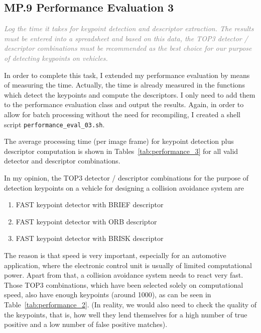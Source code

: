 \documentclass[a4paper]{scrartcl}
\begin{document}
\subsection*{MP.9 Performance Evaluation 3}
\textcolor{gray}{\textit{Log the time it takes for keypoint detection and descriptor extraction. The results must be entered into a spreadsheet and based on this data, the TOP3 detector / descriptor combinations must be recommended as the best choice for our purpose of detecting keypoints on vehicles.}}

In order to complete this task, I extended my performance evaluation by means of measuring the time.
Actually, the time is already measured in the functions which detect the keypoints and compute
the descriptors. I only need to add them to the performance evaluation class and output the results.
Again, in order to allow for batch processing without the need for recompiling,
I created a shell script \texttt{performance\_eval\_03.sh}.

The average processing time (per image frame) for keypoint detection plus descriptor computation
is shown in Tables~\ref{tab:performance_3}
for all valid detector and descriptor combinations.

In my opinion, the TOP3 detector / descriptor combinations for the purpose
of detection keypoints on a vehicle for designing a collision avoidance system
are
\begin{enumerate}
	\item FAST keypoint detector with BRIEF descriptor
	\item FAST keypoint detector with ORB descriptor
	\item FAST keypoint detector with BRISK descriptor
\end{enumerate}
The reason is that speed is very important, especially for an automotive application,
where the electronic control unit is usually of limited computational power.
Apart from that, a collision avoidance system needs to react very fast.
Those TOP3 combinations, which have been selected solely on computational speed,
also have enough keypoints (around 1000), as can be seen in Table~\ref{tab:performance_2}.
(In reality, we would also need to check the quality of the keypoints, that is, how
well they lend themselves for a high number of true positive and a low number of false positive
matches).
\end{document}
